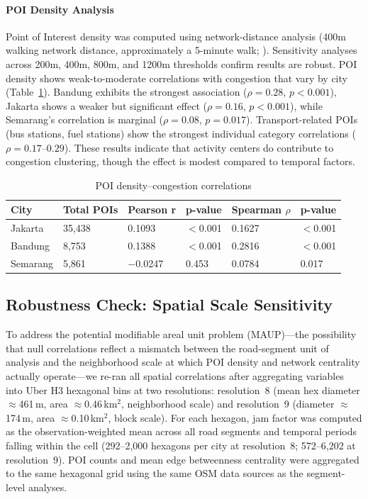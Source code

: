 \documentclass[review,authoryear]{elsarticle}
\begin{document}
\FloatBarrier
\paragraph{POI Density Analysis}

Point of Interest density was computed using network-distance analysis (400m walking network distance, approximately a 5-minute walk; \citealp{Moudon2006}). Sensitivity analyses across 200m, 400m, 800m, and 1200m thresholds confirm results are robust. POI density shows weak-to-moderate correlations with congestion that vary by city (Table~\ref{tab:table11}). Bandung exhibits the strongest association ($\rho = 0.28$, $p < 0.001$), Jakarta shows a weaker but significant effect ($\rho = 0.16$, $p < 0.001$), while Semarang's correlation is marginal ($\rho = 0.08$, $p = 0.017$). Transport-related POIs (bus stations, fuel stations) show the strongest individual category correlations ($\rho = 0.17$--$0.29$). These results indicate that activity centers do contribute to congestion clustering, though the effect is modest compared to temporal factors.

\begin{longtable}[]{@{}llllll@{}}
\caption{POI density--congestion correlations}\label{tab:table11}\\
\toprule\noalign{}
City & Total POIs & Pearson r & p-value & Spearman $\rho$ & p-value \\
\midrule\noalign{}
\endhead
\bottomrule\noalign{}
\endlastfoot
Jakarta & 35,438 & 0.1093 & $<$0.001 & 0.1627 & $<$0.001 \\
Bandung & 8,753 & 0.1388 & $<$0.001 & 0.2816 & $<$0.001 \\
Semarang & 5,861 & $-$0.0247 & 0.453 & 0.0784 & 0.017 \\
\end{longtable}

\subsection{Robustness Check: Spatial Scale Sensitivity}
\label{sec:h3_robustness}

To address the potential modifiable areal unit problem (MAUP)---the possibility that null correlations reflect a mismatch between the road-segment unit of analysis and the neighborhood scale at which POI density and network centrality actually operate---we re-ran all spatial correlations after aggregating variables into Uber H3 hexagonal bins at two resolutions: resolution~8 (mean hex diameter $\approx$461\,m, area $\approx$0.46\,km$^2$, neighborhood scale) and resolution~9 (diameter $\approx$174\,m, area $\approx$0.10\,km$^2$, block scale). For each hexagon, jam factor was computed as the observation-weighted mean across all road segments and temporal periods falling within the cell (292--2,000 hexagons per city at resolution~8; 572--6,202 at resolution~9). POI counts and mean edge betweenness centrality were aggregated to the same hexagonal grid using the same OSM data sources as the segment-level analyses.
\end{document}
